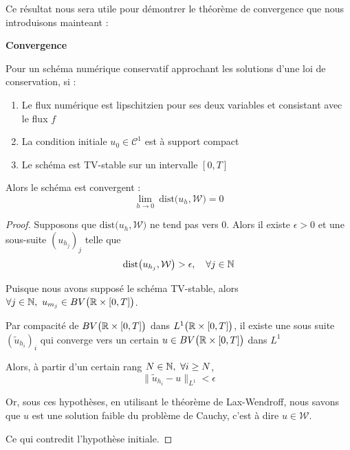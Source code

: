 Ce résultat nous sera utile pour démontrer le théorème de convergence que nous introduisons mainteant :

\begin{theorembox}
\begin{theorem}
    \textbf{Convergence}
    
    Pour un schéma numérique conservatif approchant les solutions d'une loi de conservation, si :
    \begin{enumerate}
        \item Le flux numérique est lipschitzien pour ses deux variables et consistant avec le flux $f$
        \item La condition initiale $u_0 \in \mathcal{C}^1$ est à support compact
        \item Le schéma est TV-stable sur un intervalle $[0,T]$
    \end{enumerate}
    
    Alors le schéma est convergent : 
    $$\underset{h \rightarrow 0}{\lim} \ \text{dist}\big(u_h,\mathcal{W}\big) = 0$$
\end{theorem}
\end{theorembox}

\begin{proof}
    Supposons que $\text{dist}\big(u_h,\mathcal{W}\big)$ ne tend pas vers 0.
    Alors il existe $\epsilon > 0$ et une sous-suite $(u_{h_j})_j$ telle que 
    $$\text{dist}\big(u_{h_j},\mathcal{W}\big) > \epsilon, \quad \forall j \in \mathbb{N}$$

    Puisque nous avons supposé le schéma TV-stable, alors $\forall j \in \mathbb{N}, \ u_{m_j} \in BV\big(\mathbb{R} \times [0,T]\big)$. 

    \vspace{1em}
    Par compacité de $BV\big(\mathbb{R} \times [0,T]\big)$ dans $L^1\big( \mathbb{R} \times [0,T]\big)$, il existe une sous suite $(\tilde{u}_{h_i})_i$ qui converge vers un certain $u \in BV\big( \mathbb{R} \times [0,T]\big)$ dans $L^1$

    \vspace{1em}
    Alors, à partir d'un certain rang $N \in \mathbb{N}, \ \forall i \geq N$,
    $$\| \tilde{u}_{h_i} - u \|_{L^1} < \epsilon$$

    \vspace{1em}

    Or, sous ces hypothèses, en utilisant le théorème de Lax-Wendroff, nous savons que $u$ est une solution faible du problème de Cauchy, c'est à dire $u \in \mathcal{W}$.
    
    Ce qui contredit l'hypothèse initiale.
    
\end{proof}

